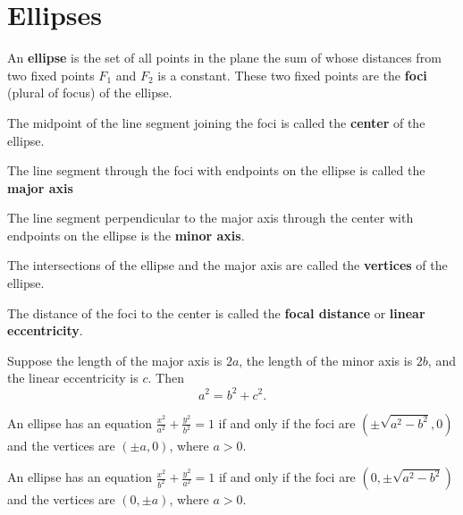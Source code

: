 \section{Ellipses}

\begin{definition}
    An \textbf{ellipse} is the set of all points in the plane the sum of whose distances from two fixed points $F_1$ and $F_2$ is a constant. These two fixed points are the \textbf{foci} (plural of focus) of the ellipse.
\end{definition}

\begin{definition}
    The midpoint of the line segment joining the foci is called the \textbf{center} of the ellipse.

    The line segment through the foci with endpoints on the ellipse is called the \textbf{major axis}

    The line segment perpendicular to the major axis through the center with endpoints on the ellipse is the \textbf{minor axis}.

    The intersections of the ellipse and the major axis are called the \textbf{vertices} of the ellipse.

    The distance of the foci to the center is called the \textbf{focal distance} or \textbf{linear eccentricity}.

\end{definition}

\begin{proposition}
    Suppose the length of the major axis is $2a$, the length of the minor axis is $2b$, and the linear eccentricity is $c$. Then
    \[a^2=b^2+c^2.\]
\end{proposition}

\begin{theorem}
An ellipse has an equation $\frac{x^2}{a^2}+\frac{y^2}{b^2}=1$ if and only if the foci are $(\pm \sqrt{a^2-b^2}, 0)$ and the vertices are $(\pm a, 0)$, where $a>0$.
\end{theorem}

\begin{theorem}
An ellipse has an equation $\frac{x^2}{b^2}+\frac{y^2}{a^2}=1$ if and only if the foci are $(0, \pm \sqrt{a^2-b^2})$ and the vertices are $(0, \pm a)$, where $a>0$.
\end{theorem}

